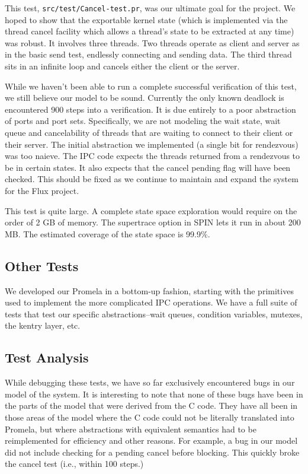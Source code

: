 This test, {\tt src/test/Cancel-test.pr}, was our ultimate goal for the
project.  We hoped to show that the exportable kernel state (which is
implemented via the thread cancel facility which allows a thread's
state to be extracted at any time) was robust.  It involves three
threads.  Two threads operate as client and server as in the basic
send test, endlessly connecting and sending data.  The third thread
sits in an infinite loop and cancels either the client or the server.  

While we haven't been able to run a complete successful verification
of this test, we still believe our model to be sound.  Currently
the only known deadlock is encountered 900 steps into a
verification. It is due entirely to a poor abstraction of ports and
port sets.  Specifically, we are not modeling the wait state, wait
queue and cancelability of threads that are waiting to connect to
their client or their server.  The initial abstraction we implemented
(a single bit for rendezvous) was too naieve.  The IPC code expects
the threads returned from a rendezvous to be in certain states.  It
also expects that the cancel pending flag will have been checked.  
This should be fixed as we continue to
maintain and expand the system for the Flux project.

This test is quite large. A complete state space exploration would
require on the order of 2 GB of memory.  The supertrace option in SPIN
lets it run in about 200 MB. The estimated coverage of the state
space is 99.9\%.  

\subsection{Other Tests}

We developed our Promela in a bottom-up fashion, starting with the
primitives used to implement the more complicated IPC operations.
We have a full suite of tests that test our specific abstractions--wait 
queues, condition variables, mutexes, the kentry layer, etc. 

\subsection{Test Analysis}

While debugging these tests, we have so far exclusively encountered 
bugs in our model of the system.  It is interesting to note that none 
of these bugs have been in the parts of the model that were derived
from the C code.  They have all been in those areas of the 
model where the C code could not be literally translated into Promela,
but where abstractions with equivalent semantics had to be reimplemented 
for efficiency and other reasons.  For example, a bug in
our model did not include checking for a pending cancel before blocking.  
This quickly broke the cancel test (i.e., within 100 steps.) 

